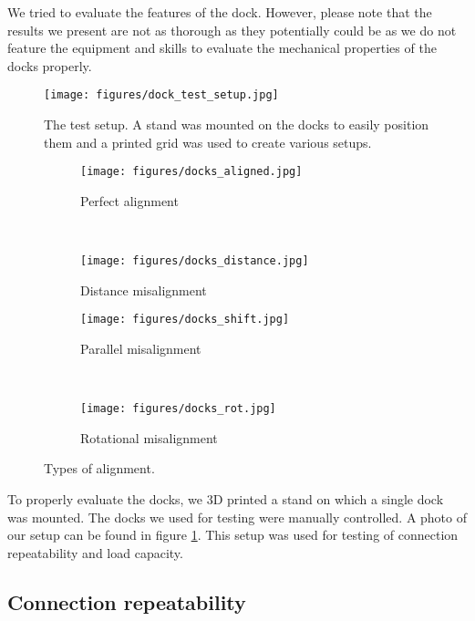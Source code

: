 We tried to evaluate the features of the dock. However, please note that the
results we present are not as thorough as they potentially could be as we do not
feature the equipment and skills to evaluate the mechanical properties of the
docks properly.

\begin{figure}[!t]
    \centering
    \texttt{[image: figures/dock\_test\_setup.jpg]}
    \caption{The test setup. A stand was mounted on the docks to easily position
    them and a printed grid was used to create various setups.}
    \label{fig:dock_test_setup}
\end{figure}

\begin{figure}[!t]
    \centering
    \begin{subfigure}[b]{0.45\textwidth}
        \texttt{[image: figures/docks\_aligned.jpg]}
        \caption{Perfect alignment}
        \label{fig:dock_test_aligned}
    \end{subfigure}
    ~
    \begin{subfigure}[b]{0.45\textwidth}
        \texttt{[image: figures/docks\_distance.jpg]}
        \caption{Distance misalignment}
        \label{fig:dock_test_distance}
    \end{subfigure}

    \begin{subfigure}[b]{0.45\textwidth}
        \texttt{[image: figures/docks\_shift.jpg]}
        \caption{Parallel misalignment}
        \label{fig:dock_test_parallel}
    \end{subfigure}
    ~
    \begin{subfigure}[b]{0.45\textwidth}
        \texttt{[image: figures/docks\_rot.jpg]}
        \caption{Rotational misalignment}
        \label{fig:dock_test_rot}
    \end{subfigure}

    \caption{Types of alignment.}
    \label{fig:dock_diplacement}
\end{figure}

To properly evaluate the docks, we 3D printed a stand on which a single dock was
mounted. The docks we used for testing were manually controlled. A photo of our
setup can be found in figure \ref{fig:dock_test_setup}. This setup was used for
testing of connection repeatability and load capacity.

\subsection{Connection repeatability}

